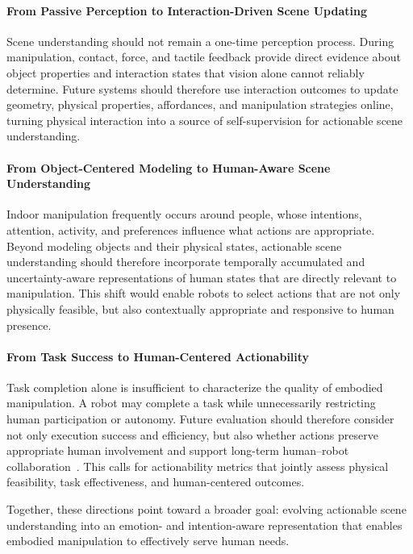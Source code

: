 \documentclass{SCIS2026}
\begin{document}
\paragraph{From Passive Perception to Interaction-Driven Scene Updating}
Scene understanding should not remain a one-time perception process. During manipulation, contact, force, and tactile feedback provide direct evidence about object properties and interaction states that vision alone cannot reliably determine. Future systems should therefore use interaction outcomes to update geometry, physical properties, affordances, and manipulation strategies online, turning physical interaction into a source of self-supervision for actionable scene understanding.

\paragraph{From Object-Centered Modeling to Human-Aware Scene Understanding}
Indoor manipulation frequently occurs around people, whose intentions, attention, activity, and preferences influence what actions are appropriate. Beyond modeling objects and their physical states, actionable scene understanding should therefore incorporate temporally accumulated and uncertainty-aware representations of human states that are directly relevant to manipulation. This shift would enable robots to select actions that are not only physically feasible, but also contextually appropriate and responsive to human presence.

\paragraph{From Task Success to Human-Centered Actionability}
Task completion alone is insufficient to characterize the quality of embodied manipulation. A robot may complete a task while unnecessarily restricting human participation or autonomy. Future evaluation should therefore consider not only execution success and efficiency, but also whether actions preserve appropriate human involvement and support long-term human--robot collaboration~\cite{puig2021watch}. This calls for actionability metrics that jointly assess physical feasibility, task effectiveness, and human-centered outcomes.

Together, these directions point toward a broader goal: evolving actionable scene understanding into an emotion- and intention-aware representation that enables embodied manipulation to effectively serve human needs.


\end{document}
